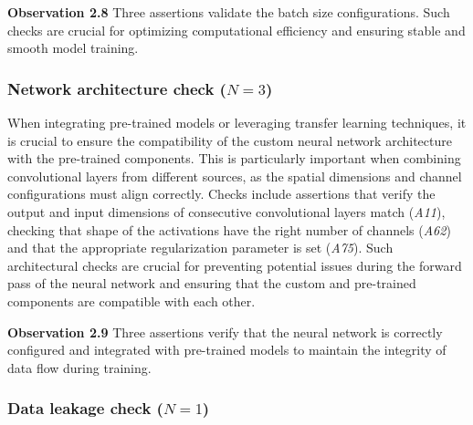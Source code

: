 \documentclass[smallextended]{svjour3}       %
\newcommand{\highlight}[1]{\begin{framed}%
  \noindent#1
\end{framed}}
\providecommand{\DIFaddbegin}{} %
\providecommand{\DIFaddend}{} %
\providecommand{\DIFdelbegin}{} %
\providecommand{\DIFdelend}{} %
\newcommand{\DIFscaledelfig}{0.5}
\newlength{\DIFdelgraphicswidth} %
\newlength{\DIFdelgraphicsheight} %
\newcommand{\DIFaddincludegraphics}[2][]{{\color{blue}\fbox{\DIFOincludegraphics[#1]{#2}}}} %
\newcommand{\DIFdelincludegraphics}[2][]{%
\sbox{\DIFdelgraphicsbox}{\DIFOincludegraphics[#1]{#2}}%
\settoboxwidth{\DIFdelgraphicswidth}{\DIFdelgraphicsbox} %
\settoboxtotalheight{\DIFdelgraphicsheight}{\DIFdelgraphicsbox} %
\scalebox{\DIFscaledelfig}{%
\parbox[b]{\DIFdelgraphicswidth}{\usebox{\DIFdelgraphicsbox}\\[-\baselineskip] \rule{\DIFdelgraphicswidth}{0em}}\llap{\resizebox{\DIFdelgraphicswidth}{\DIFdelgraphicsheight}{%
\setlength{\unitlength}{\DIFdelgraphicswidth}%
\begin{picture}(1,1)%
\thicklines\linethickness{2pt} %
{\color[rgb]{1,0,0}\put(0,0){\framebox(1,1){}}}%
{\color[rgb]{1,0,0}\put(0,0){\line( 1,1){1}}}%
{\color[rgb]{1,0,0}\put(0,1){\line(1,-1){1}}}%
\end{picture}%
}\hspace*{3pt}}} %
} %
\DeclareRobustCommand{\DIFaddbegin}{\DIFOaddbegin \let\includegraphics\DIFaddincludegraphics} %
\DeclareRobustCommand{\DIFaddend}{\DIFOaddend \let\includegraphics\DIFOincludegraphics} %
\DeclareRobustCommand{\DIFdelbegin}{\DIFOdelbegin \let\includegraphics\DIFdelincludegraphics} %
\DeclareRobustCommand{\DIFdelend}{\DIFOaddend \let\includegraphics\DIFOincludegraphics} %
\begin{document}
\DIFdelbegin %
\DIFdelend \DIFaddbegin \highlight{\textbf{Observation 2.8} Three assertions validate the batch size configurations. Such checks are crucial for optimizing computational efficiency and ensuring stable and smooth model training.}
\DIFaddend 

\subsubsection{Network architecture check ($N = 3$)}

When integrating pre-trained models or leveraging transfer learning techniques, it is crucial to ensure the compatibility of the custom neural network architecture with the pre-trained components. This is particularly important when combining convolutional layers from different sources, as the spatial dimensions and channel configurations must align correctly. Checks include assertions that verify the output and input dimensions of consecutive convolutional layers match (\emph{A11}), checking that shape of the activations have the right number of channels (\emph{A62}) and that the appropriate regularization parameter is set (\emph{A75}). Such architectural checks are crucial for preventing potential issues during the forward pass of the neural network and ensuring that the custom and pre-trained components are compatible with each other.

\DIFdelbegin %
\DIFdelend \DIFaddbegin \highlight{\textbf{Observation 2.9} Three assertions verify that the neural network is correctly configured and integrated with pre-trained models to maintain the integrity of data flow during training.}
\DIFaddend 

\subsubsection{Data leakage check ($N = 1$)}
\end{document}
